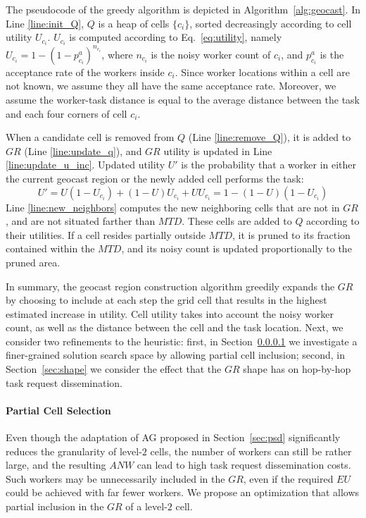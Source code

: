 \documentclass{USC-Thesis}
\numberwithin{equation}{chapter}
\begin{document}
The pseudocode of the greedy algorithm is depicted in Algorithm~\ref{alg:geocast}. In Line \ref{line:init_Q}, $Q$ is a heap of cells $\{c_i\}$, sorted decreasingly according to cell utility $U_{c_i}$. $U_{c_i}$ is computed according to Eq.~\eqref{eq:utility}, namely $U_{c_i}=1-(1-p^a_{c_i})^{n_{c_i}}$, where $n_{c_i}$ is the noisy worker count of $c_i$, and $p^a_{c_i}$ is the acceptance rate of the workers inside $c_i$. Since worker locations within a cell are not known, we assume they all have the same acceptance rate. Moreover, we assume the worker-task distance is equal to the average distance between the task and each four corners of cell $c_i$. 

When a candidate cell is removed from $Q$ (Line \ref{line:remove_Q}), it is added to $\mathit{GR}$ (Line \ref{line:update_q}), and $\mathit{GR}$ utility is updated in Line \ref{line:update_u_inc}. Updated utility $U'$ is the probability that a worker in either the current geocast region or the newly added cell performs the task: 
$$U' = U(1-U_{c_i}) + (1-U)U_{c_i} + UU_{c_i}=1-(1-U)(1-U_{c_i})$$
Line \ref{line:new_neighbors} computes the new neighboring cells that are not in $\mathit{GR}$, and are not situated farther than $\mathit{MTD}$. These cells are added to $Q$ according to their utilities. If a cell resides partially outside $MTD$, it is pruned to its fraction contained within the $MTD$, and its noisy count is updated proportionally to the pruned area.

In summary, the geocast region construction algorithm greedily expands the $\mathit{GR}$ by choosing to include at each step the grid cell that results in the highest estimated increase in utility. Cell utility takes into account the noisy worker count, as well as the distance between the cell and the task location. Next, we consider two refinements to the heuristic: first, in Section~\ref{sec:part_cell} we investigate a finer-grained solution search space by allowing partial cell inclusion; second, in Section~\ref{sec:shape} we consider the effect that the $\mathit{GR}$ shape has on hop-by-hop task request dissemination.

\paragraph{Partial Cell Selection}
\label{sec:part_cell}

Even though the adaptation of AG proposed in Section~\ref{sec:psd} significantly reduces the granularity of level-$2$ cells, the number of workers can still be rather large, and the resulting $\mathit{ANW}$ can lead to high task request dissemination costs. Such workers may be unnecessarily included in the $\mathit{GR}$, even if the required $\mathit{EU}$ could be achieved with far fewer workers. We propose an optimization that allows partial inclusion in the $\mathit{GR}$ of a level-$2$ cell.
\end{document}
